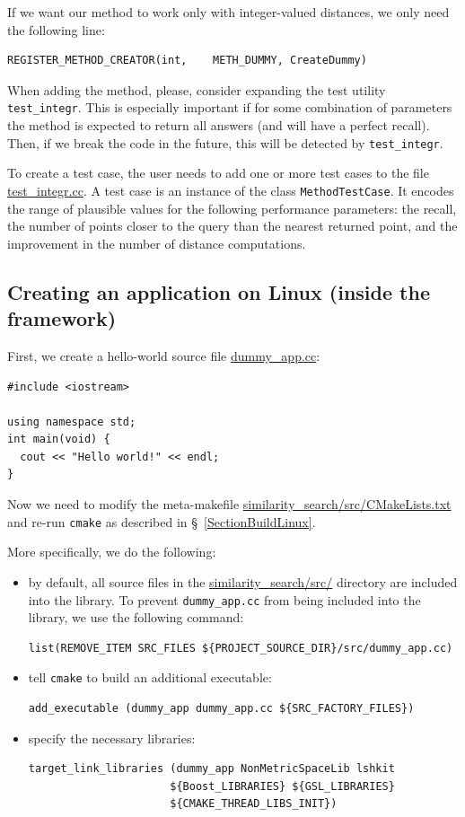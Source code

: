 \documentclass[runningheads,a4paper]{llncs}
\newcommand{\replocfile}{https://github.com/searchivarius/NonMetricSpaceLib/blob/pserv/}
\newcommand{\ttt}[1]{\texttt{#1}}
\begin{document}
If we want our method to work only with integer-valued distances,
we only need the following line:
\begin{verbatim}
REGISTER_METHOD_CREATOR(int,    METH_DUMMY, CreateDummy)
\end{verbatim}

When adding the method, please, consider expanding
the test utility \ttt{test\_integr}.
This is especially important if for some combination of parameters the method is expected
to return all answers (and will have a perfect recall). Then, if we break the code in the future,
this will be detected by \ttt{test\_integr}.

To create a test case, the user needs to add one or more test cases 
to the file
\href{\replocfile similarity_search/test/test_integr.cc#L65}{test\_integr.cc}. 
A test case is an instance of the class \ttt{MethodTestCase}. 
It encodes the range of plausible values
for the following performance parameters: the recall,
the number of points closer to the query than the nearest returned point,
and the improvement in the number of distance computations.

\subsection{Creating an application on Linux (inside the framework)}\label{SectionCreateAppLinux}
First, we create a hello-world source file 
\href{\replocfile similarity_search/src/dummy_app.cc}{dummy\_app.cc}:
\begin{verbatim}
#include <iostream>

using namespace std;
int main(void) {
  cout << "Hello world!" << endl;
}
\end{verbatim}
Now we need to modify the meta-makefile
\href{\replocfile similarity_search/src/CMakeLists.txt}{similarity\_search/src/CMakeLists.txt} and 
re-run \ttt{cmake} as described in \S~\ref{SectionBuildLinux}.

More specifically, we do the following:
\begin{itemize}
\item by default, all source files in the  
\href{\replocfile similarity_search/src/}{similarity\_search/src/} directory are included into the library.
To prevent \ttt{dummy\_app.cc} from being included into the library, we use the following command:
\begin{verbatim}
list(REMOVE_ITEM SRC_FILES ${PROJECT_SOURCE_DIR}/src/dummy_app.cc)
\end{verbatim}

\item tell \ttt{cmake} to build an additional executable:
\begin{verbatim}
add_executable (dummy_app dummy_app.cc ${SRC_FACTORY_FILES})
\end{verbatim}

\item specify the necessary libraries:
\begin{verbatim}
target_link_libraries (dummy_app NonMetricSpaceLib lshkit 
                      ${Boost_LIBRARIES} ${GSL_LIBRARIES} 
                      ${CMAKE_THREAD_LIBS_INIT})
\end{verbatim}
\end{itemize}
\end{document}
